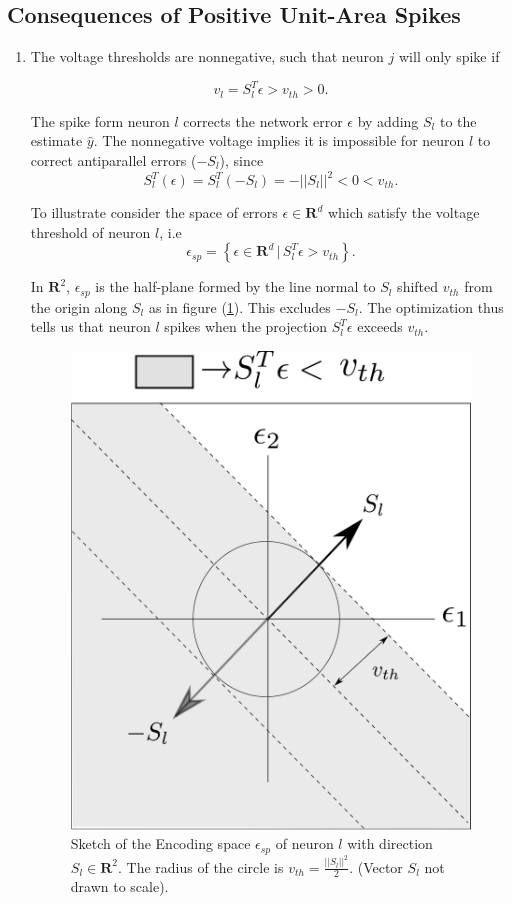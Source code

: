 \subsection{Consequences of Positive Unit-Area Spikes}
\begin{enumerate}
\item The voltage thresholds are nonnegative, such that neuron $j$ will only spike if 

$$
v_l = S_l^T \epsilon > v_{th} > 0.
$$

The spike form neuron $l$ corrects the network error $\epsilon$ by adding $S_l$ to the estimate $\hat{y}$. The nonnegative voltage implies it is impossible for neuron $l$ to correct antiparallel errors ($-S_l$), since
$$
S_l^T(\epsilon) = S_l^T(-S_l) = - ||S_l||^2 < 0 < v_{th}.
$$

To illustrate consider the space of errors $\epsilon \in \mathbf{R}^d$ which satisfy the voltage threshold of neuron $l$, i.e
$$ 
\epsilon_{sp} = \left\{ \epsilon \in \mathbf{R}^d \, | \, S_l^T \epsilon > v_{th}  \right\}. 
$$

In $\mathbf{R}^2$, $\epsilon_{sp}$ is the half-plane formed by the line normal to $S_l$ shifted $v_{th}$ from the origin along $S_l$ as in figure (\ref{fig:relu_encoding_demo}). This excludes $-S_l$. The optimization thus tells us that neuron $l$ spikes when the projection $S_l^T\epsilon$ exceeds $v_{th}$. 


\begin{figure}
\centering
\includegraphics[scale=.5]{figures/half_plane_relu_demo}
\caption{Sketch of the Encoding space $\epsilon_{sp}$ of neuron $l$ with direction $S_l \in \mathbf{R}^2.$ The radius of the circle is $v_{th}=\frac{||S_l||^2}{2}$. (Vector $S_l$ not drawn to scale).}
\label{fig:relu_encoding_demo}
\end{figure} 


\end{enumerate}

